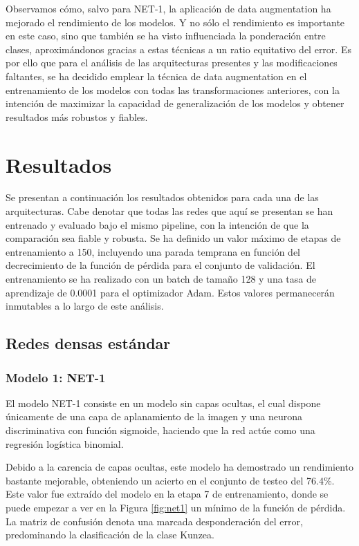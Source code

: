 \documentclass[a4paper,12pt]{article}
\begin{document}
Observamos cómo, salvo para NET-1, la aplicación de data augmentation ha mejorado el rendimiento de los modelos. Y no sólo el rendimiento es importante en este caso, sino que también se ha visto influenciada la ponderación entre clases, aproximándonos gracias a estas técnicas a un ratio equitativo del error. Es por ello que para el análisis de las arquitecturas presentes y las modificaciones faltantes, se ha decidido emplear la técnica de data augmentation en el entrenamiento de los modelos con todas las transformaciones anteriores, con la intención de maximizar la capacidad de generalización de los modelos y obtener resultados más robustos y fiables.



\newpage
\section{Resultados}

Se presentan a continuación los resultados obtenidos para cada una de las arquitecturas. Cabe denotar que todas las redes que aquí se presentan se han entrenado y evaluado bajo el mismo pipeline, con la intención de que la comparación sea fiable y robusta. Se ha definido un valor máximo de etapas de entrenamiento a 150, incluyendo una parada temprana en función del decrecimiento de la función de pérdida para el conjunto de validación. El entrenamiento se ha realizado con un batch de tamaño 128 y una tasa de aprendizaje de 0.0001 para el optimizador Adam. Estos valores permanecerán inmutables a lo largo de este análisis.

\subsection{Redes densas estándar}


\subsubsection{Modelo 1: NET-1}

El modelo NET-1 consiste en un modelo sin capas ocultas, el cual dispone únicamente de una capa de aplanamiento de la imagen y una neurona discriminativa con función sigmoide, haciendo que la red actúe como una regresión logística binomial. %

Debido a la carencia de capas ocultas, este modelo ha demostrado un rendimiento bastante mejorable, obteniendo un acierto en el conjunto de testeo del 76.4\%. Este valor fue extraído del modelo en la etapa 7 de entrenamiento, donde se puede empezar a ver en la Figura \ref{fig:net1} un mínimo de la función de pérdida. La matriz de confusión denota una marcada desponderación del error, predominando la clasificación de la clase Kunzea.
\end{document}
